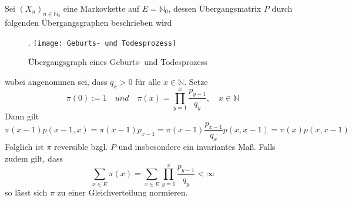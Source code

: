 Sei $(X_{n})_{n \in \mathbb{N}_{0}}$ eine Markovkette auf $E = \mathbb{N}_{0}$, dessen Übergangsmatrix $P$ durch folgenden Übergangsgraphen beschrieben wird
\begin{figure}[H].
\centering
\texttt{[image: Geburts- und Todesprozess]}
\caption{Übergangsgraph eines Geburts- und Todesprozess}
\end{figure}
\noindent
wobei angenommen sei, dass $q_{x} > 0$ für alle $x \in \mathbb{N}$. Setze
\begin{equation*}
\pi(0) := 1 \quad und \quad \pi(x) = \prod_{y=1}^{x} \dfrac{p_{y-1}}{q_{y}}, \quad x \in \mathbb{N}
\end{equation*} 
Dann gilt
\begin{equation*}
\pi(x-1)p(x-1,x) = \pi(x-1)p_{x-1} = \pi(x-1) \dfrac{p_{x-1}}{q_{x}}p(x,x-1) = \pi(x)p(x,x-1)
\end{equation*}
Folglich ist $\pi$ reversible bzgl. $P$ und insbesondere ein invariantes Maß. Falls zudem gilt, dass
\begin{equation*}
\sum_{x \in E} \pi(x) = \sum_{x \in E} \prod_{y=1}^{x} \dfrac{p_{y-1}}{q_{y}} < \infty
\end{equation*}
so lässt sich $\pi$ zu einer Gleichverteilung normieren.
